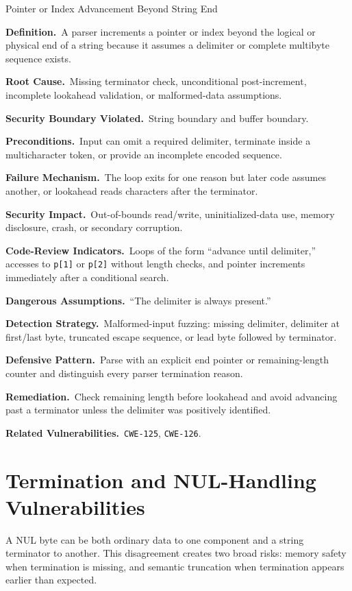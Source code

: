 \documentclass[11pt]{article}
\newcommand{\field}[1]{\par\smallskip\noindent\textbf{#1.}\ }
\newcommand{\cwe}[1]{\texttt{#1}}
\begin{document}
\begin{catalogbox}{Pointer or Index Advancement Beyond String End}
\field{Definition}A parser increments a pointer or index beyond the logical or physical end of a string because it assumes a delimiter or complete multibyte sequence exists.

\field{Root Cause}Missing terminator check, unconditional post-increment, incomplete lookahead validation, or malformed-data assumptions.

\field{Security Boundary Violated}String boundary and buffer boundary.

\field{Preconditions}Input can omit a required delimiter, terminate inside a multicharacter token, or provide an incomplete encoded sequence.

\field{Failure Mechanism}The loop exits for one reason but later code assumes another, or lookahead reads characters after the terminator.

\field{Security Impact}Out-of-bounds read/write, uninitialized-data use, memory disclosure, crash, or secondary corruption.

\field{Code-Review Indicators}Loops of the form ``advance until delimiter,'' accesses to \texttt{p[1]} or \texttt{p[2]} without length checks, and pointer increments immediately after a conditional search.

\field{Dangerous Assumptions}``The delimiter is always present.''

\field{Detection Strategy}Malformed-input fuzzing: missing delimiter, delimiter at first/last byte, truncated escape sequence, or lead byte followed by terminator.

\field{Defensive Pattern}Parse with an explicit end pointer or remaining-length counter and distinguish every parser termination reason.

\field{Remediation}Check remaining length before lookahead and avoid advancing past a terminator unless the delimiter was positively identified.

\field{Related Vulnerabilities}\cwe{CWE-125}, \cwe{CWE-126}.
\end{catalogbox}
\clearpage

\section{Termination and NUL-Handling Vulnerabilities}

A NUL byte can be both ordinary data to one component and a string terminator to another. This disagreement creates two broad risks: memory safety when termination is missing, and semantic truncation when termination appears earlier than expected.
\end{document}
